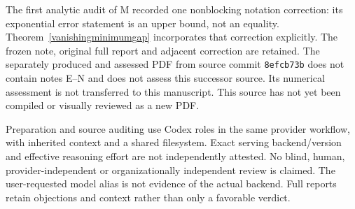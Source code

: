 \documentclass[11pt]{article}
\begin{document}
The first analytic audit of M recorded one nonblocking notation correction:
its exponential error statement is an upper bound, not an equality.
Theorem~\ref{vanishingminimumgap} incorporates that correction explicitly.
The frozen note, original full report and adjacent correction are retained.
The separately produced and assessed PDF from source commit \texttt{8efcb73b}
does not contain notes E--N and does not assess this successor source.
Its numerical assessment is not transferred to this manuscript. This source
has not yet been compiled or visually reviewed as a new PDF.

Preparation and source auditing use Codex roles in the same provider workflow, with inherited context and a shared filesystem. Exact serving backend/version and effective reasoning effort are not independently attested. No blind, human, provider-independent or organizationally independent review is claimed. The user-requested model alias is not evidence of the actual backend. Full reports retain objections and context rather than only a favorable verdict.
\end{document}
